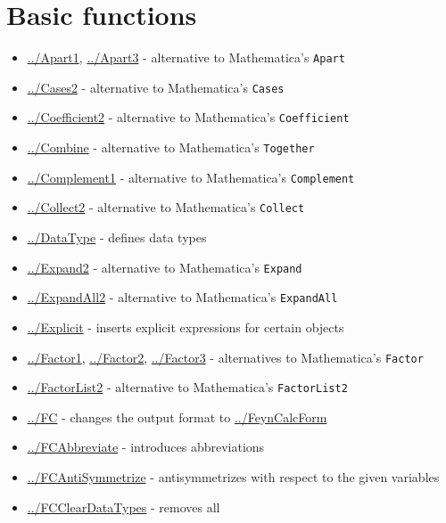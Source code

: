 \documentclass[../FeynCalcManual.tex]{subfiles}
\begin{document}
\hypertarget{basic functions}{
\section{Basic functions}\label{basic functions}}

\begin{itemize}
\tightlist
\item
  \hyperlink{../apart1}{../Apart1}, \hyperlink{../apart3}{../Apart3} -
  alternative to Mathematica's \texttt{Apart}
\item
  \hyperlink{../cases2}{../Cases2} - alternative to Mathematica's
  \texttt{Cases}
\item
  \hyperlink{../coefficient2}{../Coefficient2} - alternative to
  Mathematica's \texttt{Coefficient}
\item
  \hyperlink{../combine}{../Combine} - alternative to Mathematica's
  \texttt{Together}
\item
  \hyperlink{../complement1}{../Complement1} - alternative to
  Mathematica's \texttt{Complement}
\item
  \hyperlink{../collect2}{../Collect2} - alternative to Mathematica's
  \texttt{Collect}
\item
  \hyperlink{../datatype}{../DataType} - defines data types
\item
  \hyperlink{../expand2}{../Expand2} - alternative to Mathematica's
  \texttt{Expand}
\item
  \hyperlink{../expandall2}{../ExpandAll2} - alternative to
  Mathematica's \texttt{ExpandAll}
\item
  \hyperlink{../explicit}{../Explicit} - inserts explicit expressions
  for certain objects
\item
  \hyperlink{../factor1}{../Factor1},
  \hyperlink{../factor2}{../Factor2}, \hyperlink{../factor3}{../Factor3}
  - alternatives to Mathematica's \texttt{Factor}
\item
  \hyperlink{../factorlist2}{../FactorList2} - alternative to
  Mathematica's \texttt{FactorList2}
\item
  \hyperlink{../fc}{../FC} - changes the output format to
  \hyperlink{../feyncalcform}{../FeynCalcForm}
\item
  \hyperlink{../fcabbreviate}{../FCAbbreviate} - introduces
  abbreviations
\item
  \hyperlink{../fcantisymmetrize}{../FCAntiSymmetrize} - antisymmetrizes
  with respect to the given variables
\item
  \hyperlink{../fccleardatatypes}{../FCClearDataTypes} - removes all

\end{itemize}
\end{document}
